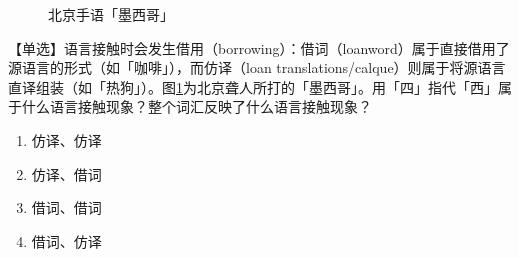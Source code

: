 \documentclass[12pt, a4paper, oneside]{ctexart}
\begin{document}
\begin{figure}[H]
{\begin{minipage}[t]{0.33\linewidth}
    \end{minipage}%
    \label{fig:si}%
    }%
    \caption{北京手语「墨西哥」}
    \label{fig:北京手语「墨西哥」}
\end{figure}
【单选】语言接触时会发生借用（borrowing）：借词（loanword）属于直接借用了源语言的形式（如「咖啡」），而仿译（loan translations/calque）则属于将源语言直译组装（如「热狗」）。图\ref{fig:北京手语「墨西哥」}为北京聋人所打的「墨西哥」。用「四」指代「西」属于什么语言接触现象？整个词汇反映了什么语言接触现象？
\begin{enumerate}[label=\Alph*.]
    \item 仿译、仿译
    \item 仿译、借词
    \item 借词、借词
    \item 借词、仿译
\end{enumerate}
\end{document}

